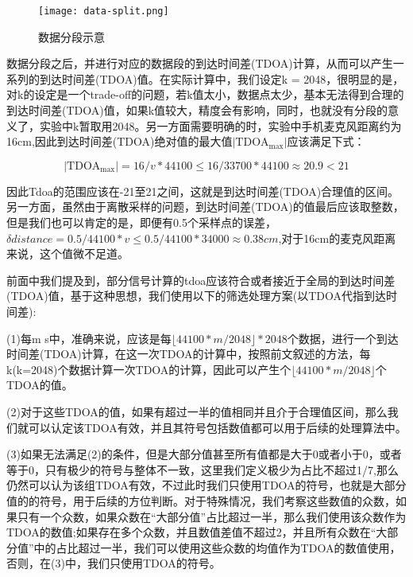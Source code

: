 \documentclass[winfonts]{njuthesis}
\begin{document}
		\begin{figure}[H]
			\centering
			\texttt{[image: data-split.png]} 
			\caption{{数据分段示意}}
			\label{fig: data-split}
		\end{figure}
		
		数据分段之后，并进行对应的数据段的到达时间差(TDOA)计算，从而可以产生一系列的到达时间差(TDOA)值。在实际计算中，我们设定k = 2048，很明显的是，对k的设定是一个trade-off的问题，若k值太小，数据点太少，基本无法得到合理的到达时间差(TDOA)值，如果k值较大，精度会有影响，同时，也就没有分段的意义了，实验中k暂取用2048。另一方面需要明确的时，实验中手机麦克风距离约为16cm,因此到达时间差(TDOA)绝对值的最大值$|\text{TDOA}_{\text{max}}|$应该满足下式：
		
		\begin{equation}
			|\text{TDOA}_{\text{max}}| = 16 / v * 44100 \leq 16 / 33700 * 44100  \approx 20.9 < 21
		\end{equation}
		
		因此Tdoa的范围应该在-21至21之间，这就是到达时间差(TDOA)合理值的区间。另一方面，虽然由于离散采样的问题，到达时间差(TDOA)的值最后应该取整数，但是我们也可以肯定的是，即便有0.5个采样点的误差，$\delta distance = 0.5 / 44100 * v \leq 0.5 / 44100 * 34000 \approx 0.38cm$,对于16cm的麦克风距离来说，这个值微不足道。
		
		前面中我们提及到，部分信号计算的tdoa应该符合或者接近于全局的到达时间差(TDOA)值，基于这种思想，我们使用以下的筛选处理方案(以TDOA代指到达时间差):
		
		(1)每m s中，准确来说，应该是每$\lfloor 44100 * m / 2048 \rfloor * 2048 $个数据，进行一个到达时间差(TDOA)计算，在这一次TDOA的计算中，按照前文叙述的方法，每k(k=2048)个数据计算一次TDOA的计算，因此可以产生个$\lfloor 44100 * m / 2048 \rfloor$个TDOA的值。
		
		(2)对于这些TDOA的值，如果有超过一半的值相同并且介于合理值区间，那么我们就可以认定该TDOA有效，并且其符号包括数值都可以用于后续的处理算法中。
		
		(3)如果无法满足(2)的条件，但是大部分值甚至所有值都是大于0或者小于0，或者等于0，只有极少的符号与整体不一致，这里我们定义极少为占比不超过1/7,那么仍然可以认为该组TDOA有效，不过此时我们只使用TDOA的符号，也就是大部分值的的符号，用于后续的方位判断。对于特殊情况，我们考察这些数值的众数，如果只有一个众数，如果众数在“大部分值”占比超过一半，那么我们使用该众数作为TDOA的数值;如果存在多个众数，并且数值差值不超过2，并且所有众数在“大部分值”中的占比超过一半，我们可以使用这些众数的均值作为TDOA的数值使用，否则，在(3)中，我们只使用TDOA的符号。
		
\end{document}
